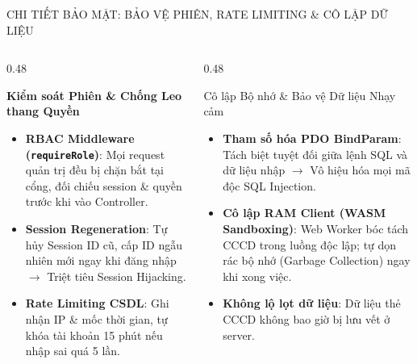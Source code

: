 \documentclass[aspectratio=169, 10pt]{beamer}
\begin{document}
\begin{frame}{CHI TIẾT BẢO MẬT: BẢO VỆ PHIÊN, RATE LIMITING \& CÔ LẬP DỮ LIỆU}
  \begin{columns}[T]
    \begin{column}{0.48\textwidth}
      \begin{infoCard}
        \textbf{\color{DarkRed}Kiểm soát Phiên \& Chống Leo thang Quyền}
        \fontsize{6.8pt}{8.5pt}\selectfont
        \begin{itemize}
          \setlength{\itemsep}{1.5pt}
          \item \textbf{RBAC Middleware (\texttt{requireRole})}: Mọi request quản trị đều bị chặn bắt tại cổng, đối chiếu session \& quyền trước khi vào Controller.
          \item \textbf{Session Regeneration}: Tự hủy Session ID cũ, cấp ID ngẫu nhiên mới ngay khi đăng nhập $\to$ Triệt tiêu Session Hijacking.
          \item \textbf{Rate Limiting CSDL}: Ghi nhận IP \& mốc thời gian, tự khóa tài khoản 15 phút nếu nhập sai quá 5 lần.
        \end{itemize}
      \end{infoCard}
    \end{column}
    \begin{column}{0.48\textwidth}
      \begin{greenCard}{Cô lập Bộ nhớ \& Bảo vệ Dữ liệu Nhạy cảm}
        \fontsize{6.8pt}{8.5pt}\selectfont
        \begin{itemize}
          \setlength{\itemsep}{1.5pt}
          \item \textbf{Tham số hóa PDO BindParam}: Tách biệt tuyệt đối giữa lệnh SQL và dữ liệu nhập $\to$ Vô hiệu hóa mọi mã độc SQL Injection.
          \item \textbf{Cô lập RAM Client (WASM Sandboxing)}: Web Worker bóc tách CCCD trong luồng độc lập; tự dọn rác bộ nhớ (Garbage Collection) ngay khi xong việc.
          \item \textbf{Không lộ lọt dữ liệu}: Dữ liệu thẻ CCCD không bao giờ bị lưu vết ở server.
        \end{itemize}
      \end{greenCard}
    \end{column}
  \end{columns}
\end{frame}
\end{document}
